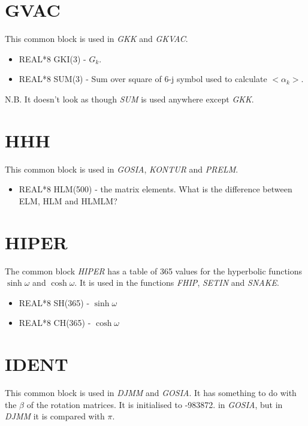 \section{GVAC}

This common block is used in {\em GKK} and {\em GKVAC}.

\begin{itemize}
\item REAL*8 GKI(3) - $G_k$.
\item REAL*8 SUM(3) - Sum over square of 6-j symbol used to calculate
$<\alpha_k>$.
\end{itemize}

N.B. It doesn't look as though {\em SUM} is used anywhere except {\em GKK}.

\section{HHH}

This common block is used in {\em GOSIA}, {\em KONTUR} and {\em PRELM}.

\begin{itemize}
\item REAL*8 HLM(500) - the matrix elements. What is the difference between
ELM, HLM and HLMLM?
\end{itemize}

\section{HIPER}

The common block {\em HIPER} has a table of 365 values for the hyperbolic
functions $\sinh\omega$ and $\cosh\omega$. It is used in the functions {\em
FHIP}, {\em SETIN} and {\em SNAKE}.

\begin{itemize}
\item REAL*8 SH(365) - $\sinh\omega$
\item REAL*8 CH(365) - $\cosh\omega$
\end{itemize}

\section{IDENT}

This common block is used in {\em DJMM} and {\em GOSIA}. It has something to
do with the $\beta$ of the rotation matrices. It is initialised to -983872.
in {\em GOSIA}, but in {\em DJMM} it is compared with $\pi$.

